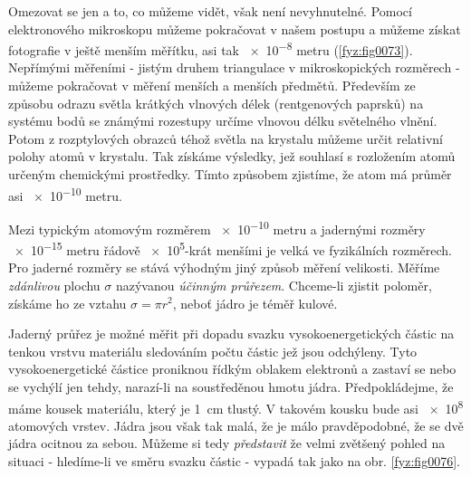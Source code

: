     Omezovat se jen a to, co můžeme vidět, však není  nevyhnutelné. Pomocí elektronového mikroskopu 
    můžeme pokračovat v našem postupu a můžeme získat fotografie v ještě menším měřítku, asi tak 
    \num{e-8} metru  (\ref{fyz:fig0073}). Nepřímými měřeními - jistým druhem triangulace v 
    mikroskopických rozměrech - můžeme pokračovat v měření menších a menších předmětů. Především ze 
    způsobu odrazu světla krátkých vlnových délek (rentgenových paprsků) na systému bodů se známými 
    rozestupy určíme vlnovou délku světelného vlnění. Potom z rozptylových obrazců téhož světla na 
    krystalu můžeme určit relativní polohy atomů v krystalu. Tak získáme výsledky, jež souhlasí s 
    rozložením atomů určeným chemickými prostředky. Tímto způsobem zjistíme, že atom má průměr asi 
    \num{e-10} metru. 

    Mezi typickým atomovým rozměrem \num{e-10} metru a jadernými rozměry \num{e-15} metru řádově 
    \num{e5}-krát menšími je velká  ve fyzikálních rozměrech. Pro jaderné rozměry se 
    stává výhodným jiný způsob měření velikosti. Měříme \emph{zdánlivou} plochu \(\sigma\) 
    nazývanou \emph{účinným průřezem}. Chceme-li zjistit poloměr, získáme ho ze vztahu \(\sigma = 
    \pi r^2\), neboť jádro je téměř kulové. 

    Jaderný průřez je možné měřit při dopadu svazku vysokoenergetických částic na tenkou vrstvu 
    materiálu sledováním počtu částic jež jsou odchýleny. Tyto vysokoenergetické částice  proniknou 
    řídkým oblakem elektronů a zastaví se nebo se vychýlí jen tehdy, narazí-li na soustředěnou 
    hmotu jádra. Předpokládejme, že máme kousek materiálu, který je \SI{1}{\cm} tlustý. V takovém 
    kousku bude asi \num{e8} atomových vrstev. Jádra jsou však tak malá, že je málo pravděpodobné, 
    že se dvě jádra ocitnou za sebou. Můžeme si tedy \emph{představit} že velmi zvětšený pohled na 
    situaci - hledíme-li ve směru svazku částic - vypadá tak jako na obr. \ref{fyz:fig0076}. 


